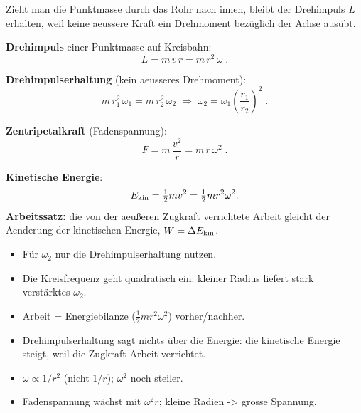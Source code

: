 

Zieht man die Punktmasse durch das Rohr nach innen, bleibt der
Drehimpuls $L$ erhalten, weil keine aeussere Kraft ein Drehmoment
bezüglich der Achse ausübt.

\begin{werkzeugkasten}[Werkzeuge]
\textbf{Drehimpuls} einer Punktmasse auf Kreisbahn:
\begin{equation}
  L=m\,v\,r=m\,r^2\,\omega\;.
\end{equation}

\textbf{Drehimpulserhaltung} (kein aeusseres Drehmoment):
\begin{equation}
  m\,r_1^2\,\omega_1=m\,r_2^2\,\omega_2
  \;\Rightarrow\;\omega_2=\omega_1\left(\frac{r_1}{r_2}\right)^2\;.
\end{equation}

\textbf{Zentripetalkraft} (Fadenspannung):
\begin{equation}
  F=m\,\frac{v^2}{r}=m\,r\,\omega^2\;.
\end{equation}

\textbf{Kinetische Energie}:
\begin{equation}
  E_{\rm kin}=\tfrac12 m v^2=\tfrac12 m r^2\omega^2.
\end{equation}
\textbf{Arbeitssatz:} die von der aeu{\ss}eren Zugkraft verrichtete Arbeit
gleicht der Aenderung der kinetischen Energie, $W=\Delta E_{\rm kin}$.
\end{werkzeugkasten}

\begin{werkzeugkasten}[Vorgehen]
\begin{itemize}
  \item Für $\omega_2$ nur die Drehimpulserhaltung nutzen.
  \item Die Kreisfrequenz geht quadratisch ein: kleiner Radius liefert
        stark verstärktes $\omega_2$.
  \item Arbeit = Energiebilanze ($\tfrac12 m r^2\omega^2$) vorher/nachher.
\end{itemize}
\end{werkzeugkasten}

\begin{achtung}
\begin{itemize}
  \item Drehimpulserhaltung sagt nichts über die Energie: die kinetische
        Energie steigt, weil die Zugkraft Arbeit verrichtet.
  \item $\omega\propto 1/r^2$ (nicht $1/r$); $\omega^2$ noch steiler.
  \item Fadenspannung wächst mit $\omega^2 r$; kleine Radien -> grosse
        Spannung.
\end{itemize}
\end{achtung}
